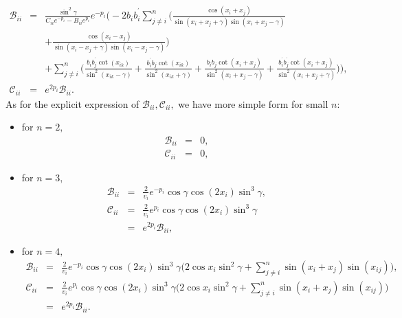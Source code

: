 \documentclass[a4paper,12pt]{article}
\begin{document}
\begin{eqnarray}
\mathcal{B}_{ii} &=&\frac{\sin ^{2}\gamma }{C_{ii}e^{-p_{i}}-B_{ii}e^{p_{i}}}%
e^{-p_{i}}\Big(-2b_{i}b_{i}^{^{\prime }}\sum_{j\neq i}^{n}\Big(\frac{\cos
(x_{i}+x_{j})}{\sin (x_{i}+x_{j}+\gamma )\sin (x_{i}+x_{j}-\gamma )}
\nonumber \\
&&+\frac{\cos (x_{i}-x_{j})}{\sin (x_{i}-x_{j}+\gamma )\sin
(x_{i}-x_{j}-\gamma )}\Big)  \nonumber \\
&&+\sum_{j\neq i}^{n}\Big(\frac{b_{i}b_{j}^{^{\prime }}\cot (x_{ik})}{\sin
^{2}(x_{ik}-\gamma )}+\frac{b_{i}^{^{\prime }}b_{j}\cot (x_{ik})}{\sin
^{2}(x_{ik}+\gamma )}+\frac{b_{i}b_{j}\cot (x_{i}+x_{j})}{\sin
^{2}(x_{i}+x_{j}-\gamma )}+\frac{b_{i}^{^{\prime }}b_{j}^{^{\prime }}\cot
(x_{i}+x_{j})}{\sin ^{2}(x_{i}+x_{j}+\gamma )}\Big)\Big),  \nonumber \\
\mathcal{C}_{ii} &=&e^{2p_{i}}\mathcal{B}_{ii}.
\end{eqnarray}
As for the explicit expression of $\mathcal{B}_{ii},\mathcal{C}_{ii},$ we
have more simple form for small $n:$

\begin{itemize}
\item  for $n=2,$
\begin{eqnarray}
\mathcal{B}_{ii} &=&0,  \nonumber \\
\mathcal{C}_{ii} &=&0,
\end{eqnarray}

\item  for $n=3,$
\begin{eqnarray}
\mathcal{B}_{ii} &=&\frac{2}{v_{i}}e^{-p_{i}}\cos \gamma \cos (2x_{i})\sin
^{3}\gamma ,  \nonumber \\
\mathcal{C}_{ii} &=&\frac{2}{v_{i}}e^{p_{i}}\cos \gamma \cos (2x_{i})\sin
^{3}\gamma   \nonumber \\
&=&e^{2p_{i}}\mathcal{B}_{ii},
\end{eqnarray}

\item  for $n=4,$
\begin{eqnarray}
\mathcal{B}_{ii} &=&\frac{2}{v_{i}}e^{-p_{i}}\cos \gamma \cos (2x_{i})\sin
^{3}\gamma \Big(2\cos x_{i}\sin ^{2}\gamma +\sum_{j\neq i}^{n}\sin
(x_{i}+x_{j})\sin (x_{ij})\Big),  \nonumber \\
\mathcal{C}_{ii} &=&\frac{2}{v_{i}}e^{p_{i}}\cos \gamma \cos (2x_{i})\sin
^{3}\gamma \Big(2\cos x_{i}\sin ^{2}\gamma +\sum_{j\neq i}^{n}\sin
(x_{i}+x_{j})\sin (x_{ij})\Big)  \nonumber \\
&=&e^{2p_{i}}\mathcal{B}_{ii}.
\end{eqnarray}
\end{itemize}
\end{document}
